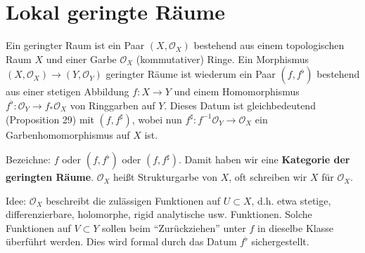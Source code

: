 \section{Lokal geringte Räume}
\label{sec:lokal-geringte-raeume}
\begin{defn}
  Ein geringter Raum ist ein Paar $(X,\mathcal{O}_{X})$ bestehend aus
  einem topologischen Raum $X$ und einer Garbe $\mathcal{O}_{X}$ (kommutativer)
  Ringe. Ein Morphismus $(X,\mathcal{O}_{X})\rightarrow(Y,\mathcal{O}_{Y})$
  geringter Räume ist wiederum ein Paar $(f,f^{\flat})$ bestehend aus
  einer stetigen Abbildung $f:X\rightarrow Y$ und einem Homomorphismus
  $f^{\flat}:\mathcal{O}_{Y}\rightarrow f_{\ast}\mathcal{O}_{X}$ von
  Ringgarben auf $Y$. Dieses Datum ist gleichbedeutend (Proposition
  29) mit $(f,f^{\sharp})$, wobei nun $f^{\sharp}:f^{-1}\mathcal{O}_{Y}\rightarrow\mathcal{O}_{X}$
  ein Garbenhomomorphismus auf $X$ ist.

  Bezeichne: $f$ oder $(f,f^{\flat})$ oder $(f,f^{\sharp})$. Damit
  haben wir eine \textbf{Kategorie der geringten Räume}. $\mathcal{O}_{X}$
  heißt Strukturgarbe von $X$, oft schreiben
  wir $X$ für $\mathcal{O}_{X}$.

  Idee: $\mathcal{O}_{X}$ beschreibt die zulässigen Funktionen auf
  $U\subset X$, d.h. etwa stetige, differenzierbare, holomorphe, rigid
  analytische usw. Funktionen. Solche Funktionen auf $V\subset Y$ sollen
  beim ``Zurückziehen'' unter $f$ in dieselbe Klasse überführt werden.
  Dies wird formal durch das Datum $f^{\flat}$ sichergestellt.
\end{defn}

